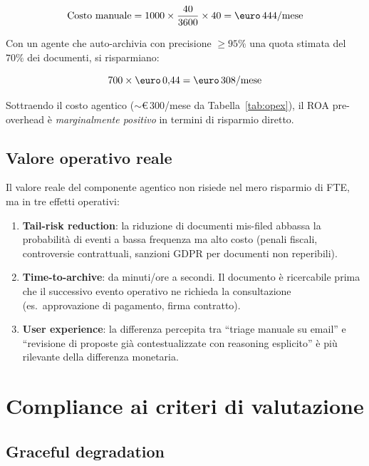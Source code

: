 \[
\text{Costo manuale} = 1000 \times \frac{40}{3600} \times 40 = \text{\euro}\,444/\text{mese}
\]

Con un agente che auto-archivia con precisione $\geq 95\%$ una quota stimata del $70\%$
dei documenti, si risparmiano:

\[
700 \times \text{\euro}\,0{,}44 = \text{\euro}\,308/\text{mese}
\]

Sottraendo il costo agentico ($\sim$\euro$\,300$/mese da Tabella~\ref{tab:opex}),
il ROA pre-overhead \`e \emph{marginalmente positivo} in termini di risparmio diretto.

\subsection{Valore operativo reale}

Il valore reale del componente agentico non risiede nel mero risparmio di FTE, ma in
tre effetti operativi:

\begin{enumerate}[leftmargin=*]
    \item \textbf{Tail-risk reduction}: la riduzione di documenti mis-filed abbassa
          la probabilit\`a di eventi a bassa frequenza ma alto costo (penali fiscali,
          controversie contrattuali, sanzioni GDPR per documenti non reperibili).

    \item \textbf{Time-to-archive}: da minuti/ore a secondi. Il documento \`e
          ricercabile prima che il successivo evento operativo ne richieda la
          consultazione (es.\ approvazione di pagamento, firma contratto).

    \item \textbf{User experience}: la differenza percepita tra ``triage manuale su
          email'' e ``revisione di proposte gi\`a contestualizzate con reasoning
          esplicito'' \`e pi\`u rilevante della differenza monetaria.
\end{enumerate}

\section{Compliance ai criteri di valutazione}
\label{sec:compliance}

\subsection{Graceful degradation}

